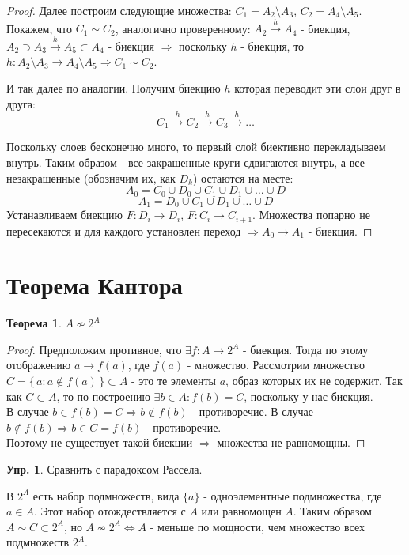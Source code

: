 \documentclass[12pt]{article}
\theoremstyle{definition}
\newtheorem{exrc}{Упр.}
\newtheorem{theorem}{Теорема}
\begin{document}
\begin{proof}
Далее построим следующие множества: $C_1 = A_2 \setminus A_3, \, C_2 = A_4 \setminus A_5$.\\
Покажем, что $C_1 \sim C_2$, аналогично проверенному: $A_2 \xrightarrow{h} A_4$ - биекция, $A_2 \supset A_3 \xrightarrow{h} A_5 \subset A_4$ - биекция $\Rightarrow$ поскольку $h$ - биекция, то $h\colon A_2 \setminus A_3 \rightarrow A_4 \setminus A_5 \Rightarrow C_1 \sim C_2$.

И так далее по аналогии. Получим биекцию $h$ которая переводит эти слои друг в друга: 
$$C_1 \xrightarrow{h} C_2 \xrightarrow{h} C_3 \xrightarrow{h} \dotsc$$

Поскольку слоев бесконечно много, то первый слой биективно перекладываем внутрь. Таким образом - все закрашенные круги сдвигаются внутрь, а все незакрашенные (обозначим их, как $D_k$) остаются на месте:
$$A_0 = C_0 \cup D_0 \cup C_1 \cup D_1 \cup \dotsc \cup D$$
$$A_1 = D_0 \cup C_1 \cup D_1 \cup \dotsc \cup D$$
Устанавливаем биекцию $F \colon D_i \rightarrow D_i$, $F \colon C_i \rightarrow C_{i+1}$. Множества попарно не пересекаются и для каждого установлен переход $\Rightarrow A_0 \rightarrow A_1$ - биекция.
\end{proof}

\section*{Теорема Кантора}

\begin{theorem}
	$A \nsim 2^A$
\end{theorem}
\begin{proof}
	Предположим противное, что $\exists f \colon A \rightarrow 2^A$ - биекция. Тогда по этому отображению $a \rightarrow f(a)$, где $f(a)$ - множество.
	Рассмотрим множество $C = \{\,a \colon a \notin f(a)\,\} \subset A$ - это те элементы $a$, образ которых их не содержит. Так как $C \subset A$, то по построению $\exists b \in A \colon f(b) = C$, поскольку у нас биекция.\\
	В случае $b \in f(b) = C \Rightarrow b \notin f(b)$ - противоречие. В случае $b \notin f(b) \Rightarrow b \in C = f(b)$ - противоречие.\\ 
	Поэтому не существует такой биекции $\Rightarrow$ множества не равномощны. 
\end{proof}
 \begin{exrc}
 	Сравнить с парадоксом Рассела.
 \end{exrc}
 
 В $2^A$ есть набор подмножеств, вида $\{a\}$  - одноэлементные подмножества, где $a \in A$. Этот набор отождествляется с $A$ или равномощен $A$. Таким образом 
 $A \sim C \subset 2^A$, но $A \nsim 2^A \Leftrightarrow A$ - меньше по мощности, чем множество всех подмножеств $2^A$. 
 
\end{document}
